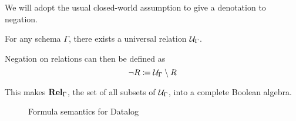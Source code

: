 We will adopt the usual closed-world assumption to give a denotation to negation.

\begin{defn}
  For any schema $\Gamma$,
  there exists a universal relation $\mathcal{U}_\Gamma$.

  Negation on relations can then be defined as
  \begin{displaymath}
    \neg R \coloneqq \mathcal{U}_\Gamma \setminus R
  \end{displaymath}
\end{defn}

This makes $\mathbf{Rel}_\Gamma$, the set of all subsets of $\mathcal{U}_\Gamma$,
into a complete Boolean algebra.

\begin{figure}
  \caption{Formula semantics for Datalog}
  \label{fig:datalogSemantics}
  \vspace{-12pt}
\end{figure}

